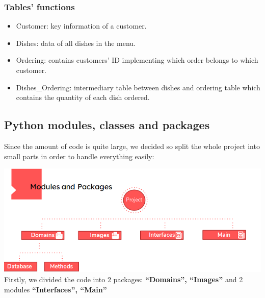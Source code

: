 \vspace{0.5cm}
\subsubsection{Tables’ functions}
\begin{itemize}
  \item Customer: key information of a customer.
  \item Dishes: data of all dishes in the menu. 
  \item Ordering: contains customers’ ID implementing which order belongs to which customer.
  \item Dishes\_Ordering: intermediary table between dishes and ordering table which contains the quantity of each dish ordered.
\end{itemize}

\newpage
\subsection{Python modules, classes and packages}
\hspace{0.7cm}Since the amount of code is quite large, we decided so split the whole project into small parts in order to handle everything easily:

\vspace{1cm}
\includegraphics{images/modules and package.png}
\hspace{0.7cm}Firstly, we divided the code into 2 packages: \textbf{“Domains”, “Images”} and 2 modules \textbf{“Interfaces”, “Main”}

